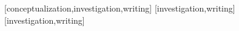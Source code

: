 \documentclass[portuguese]{textolivre}
\begin{document}
\printbibliography\label{sec-bib}
\begin{contributors}
[conceptualization,investigation,writing]
[investigation,writing]
[investigation,writing]
\end{contributors}
\end{document}
